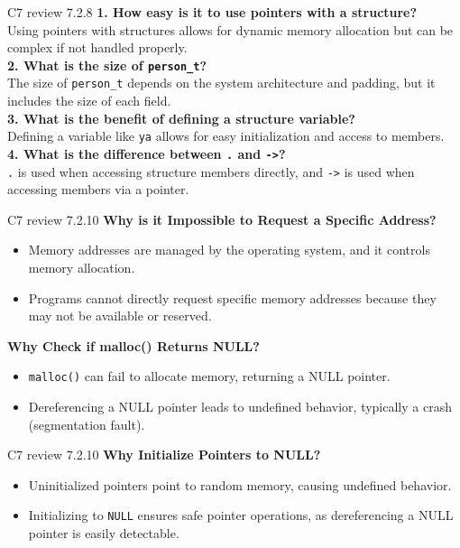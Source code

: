 \documentclass[
	11pt, %
]{beamer}
\begin{document}

\begin{frame}{C7 review 7.2.8}
    \textbf{1. How easy is it to use pointers with a structure?} \\
    Using pointers with structures allows for dynamic memory allocation but can be complex if not handled properly. \\
    \textbf{2. What is the size of \texttt{person\_t}?} \\
    The size of \texttt{person\_t} depends on the system architecture and padding, but it includes the size of each field. \\
    \textbf{3. What is the benefit of defining a structure variable?} \\
    Defining a variable like \texttt{ya} allows for easy initialization and access to members. \\
    \textbf{4. What is the difference between \texttt{.} and \texttt{->}?} \\
    \texttt{.} is used when accessing structure members directly, and \texttt{->} is used when accessing members via a pointer. \\
\end{frame}


\begin{frame}{C7 review 7.2.10}
    \textbf{Why is it Impossible to Request a Specific Address?}
    \begin{itemize}
        \item Memory addresses are managed by the operating system, and it controls memory allocation.
        \item Programs cannot directly request specific memory addresses because they may not be available or reserved.
    \end{itemize}
    \textbf{Why Check if malloc() Returns NULL?}
    \begin{itemize}
        \item \texttt{malloc()} can fail to allocate memory, returning a NULL pointer.
        \item Dereferencing a NULL pointer leads to undefined behavior, typically a crash (segmentation fault).
    \end{itemize}
\end{frame}

\begin{frame}{C7 review 7.2.10}
    \textbf{Why Initialize Pointers to NULL?}
    \begin{itemize}
        \item Uninitialized pointers point to random memory, causing undefined behavior.
        \item Initializing to \texttt{NULL} ensures safe pointer operations, as dereferencing a NULL pointer is easily detectable.
    \end{itemize}
\end{frame}
\end{document}
